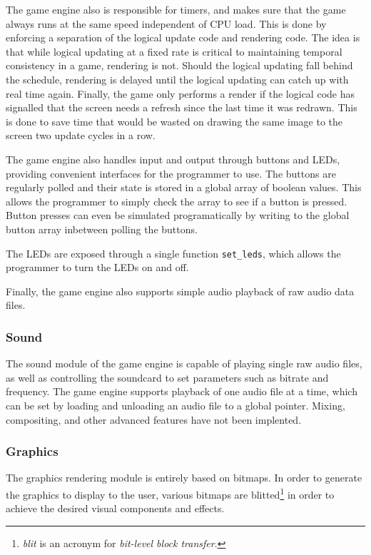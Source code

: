     The game engine also is responsible for timers, and makes sure that the game always runs at the same speed independent of CPU load.
    This is done by enforcing a separation of the logical update code and rendering code.
    The idea is that while logical updating at a fixed rate is critical to maintaining temporal consistency in a game, rendering is not.
    Should the logical updating fall behind the schedule, rendering is delayed until the logical updating can catch up with real time again.
    Finally, the game only performs a render if the logical code has signalled that the screen needs a refresh since the last time it was redrawn.
    This is done to save time that would be wasted on drawing the same image to the screen two update cycles in a row.

    The game engine also handles input and output through buttons and LEDs, providing convenient interfaces for the programmer to use.
    The buttons are regularly polled and their state is stored in a global array of boolean values.
    This allows the programmer to simply check the array to see if a button is pressed.
    Button presses can even be simulated programatically by writing to the global button array inbetween polling the buttons.

    The LEDs are exposed through a single function \texttt{set_leds}, which allows the programmer to turn the LEDs on and off.


    Finally, the game engine also supports simple audio playback of raw audio data files.

\subsubsection{Sound}
The sound module of the game engine is capable of playing single raw audio files, as well as controlling the soundcard to set parameters such as bitrate and frequency.
The game engine supports playback of one audio file at a time, which can be set by loading and unloading an audio file to a global pointer.
Mixing, compositing, and other advanced features have not been implented.

\subsubsection{Graphics}
The graphics rendering module is entirely based on bitmaps.
In order to generate the graphics to display to the user, various bitmaps are blitted\footnote{\textit{blit} is an acronym for \textit{bit-level block transfer}.} in order to achieve the desired visual components and effects.



